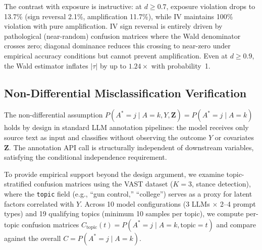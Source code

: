 \begin{table}[H]
\centering
\caption{IV Wald estimator bias by minimum-diagonal subspace.}
\label{tab:iv_dirichlet_subspace}
\small
{}
\end{table}

The contrast with exposure is instructive: at $d{\geq}0.7$, exposure violation drops to 13.7\% (sign reversal 2.1\%, amplification 11.7\%), while IV maintains 100\% violation with pure amplification. IV sign reversal is entirely driven by pathological (near-random) confusion matrices where the Wald denominator crosses zero; diagonal dominance reduces this crossing to near-zero under empirical accuracy conditions but cannot prevent amplification. Even at $d{\geq}0.9$, the Wald estimator inflates $|\tau|$ by up to $1.24\times$ with probability~1.

\subsection{Non-Differential Misclassification Verification}
\label{sec:nondiff_verify}

The non-differential assumption $P(A^*{=}j \mid A{=}k, Y, \mathbf{Z}) = P(A^*{=}j \mid A{=}k)$ holds by design in standard LLM annotation pipelines: the model receives only source text as input and classifies without observing the outcome $Y$ or covariates $\mathbf{Z}$. The annotation API call is structurally independent of downstream variables, satisfying the conditional independence requirement.

To provide empirical support beyond the design argument, we examine topic-stratified confusion matrices using the VAST dataset ($K{=}3$, stance detection), where the \texttt{topic} field (e.g., ``gun control,'' ``college'') serves as a proxy for latent factors correlated with $Y$. Across 10 model configurations (3 LLMs $\times$ 2--4 prompt types) and 19 qualifying topics (minimum 10 samples per topic), we compute per-topic confusion matrices $C_{\text{topic}}(t) = P(A^*{=}j \mid A{=}k, \text{topic}{=}t)$ and compare against the overall $C = P(A^*{=}j \mid A{=}k)$.

